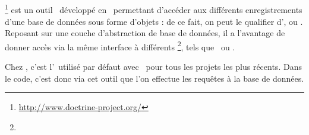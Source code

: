\subsection{\adoctrine}
\label{section:outils_doctrine}

\adoctrine\footnote{\url{http://www.doctrine-project.org/}} est un outil \aos\ développé en \aphp\ permettant d'accéder aux différents enregistrements d'une base de données sous forme d'objets : de ce fait, on peut le qualifier d'\aorm, ou \aormfull. Reposant sur une couche d'abstraction de base de données, il a l'avantage de donner accès via la même interface à différents \asgbd\footnote{\asgbdfull}, tels que \amysql\ ou \apsql.

Chez \asl, c'est l'\aorm\ utilisé par défaut avec \asf\ pour tous les projets les plus récents. Dans le code, c'est donc via cet outil que l'on effectue les requêtes à la base de données.
